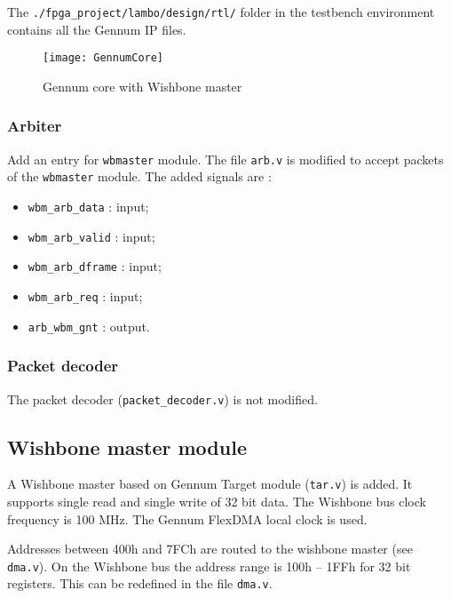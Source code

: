 \documentclass[10pt,a4paper]{cerndoc}
\begin{document}
The \verb+./fpga_project/lambo/design/rtl/+ folder in the testbench environment contains all the Gennum IP files.

\begin{figure}[!ht]
	\centering
		\texttt{[image: GennumCore]}
	\caption{Gennum core with Wishbone master}
	\label{fig:GCWWM}
\end{figure} 





  
    \subsubsection{Arbiter}
Add an entry for \verb+wbmaster+ module. The file \verb+arb.v+ is modified to accept packets of the \verb+wbmaster+ module.
The added signals are :
\begin{itemize}
  \item\texttt{wbm\_arb\_data} : input;
  \item\texttt{wbm\_arb\_valid} : input;
  \item\texttt{wbm\_arb\_dframe} : input;
  \item\texttt{wbm\_arb\_req} : input; 
  \item\texttt{arb\_wbm\_gnt} : output.
  
\end{itemize}
    \subsubsection{Packet decoder}
The packet decoder (\verb+packet_decoder.v+) is not modified.
    
  \subsection{Wishbone master module}  
A Wishbone master based on Gennum Target module (\verb+tar.v+) is added. It supports single read and single write of 32 bit data.
The Wishbone bus clock frequency is 100 MHz. The Gennum FlexDMA local clock is used.
   
Addresses between 400h and 7FCh are routed to the wishbone master (see \verb+dma.v+). On the Wishbone bus the address range is 100h -- 1FFh for 32 bit registers. This can be redefined in the file \verb+dma.v+.  
    
\end{document}
